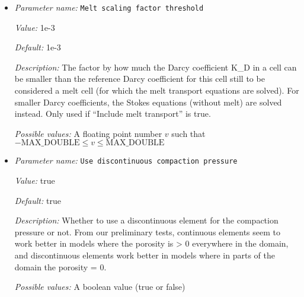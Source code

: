 \begin{itemize}
{\it Value:} false


{\it Default:} false


{\it Description:} Whether to include the transport of melt into the model or not. If this is set to true, two additional pressures (the fluid pressure and the compaction pressure) will be added to the finite element. Including melt transport in the simulation also requires that there is one compositional field that has the name `porosity'. This field will be used for computing the additional pressures and the melt velocity, and has a different advection equation than other compositional fields, as it is effectively advected with the melt velocity.


{\it Possible values:} A boolean value (true or false)
\item {\it Parameter name:} {\tt Melt scaling factor threshold}
\label{parameters:Melt settings/Melt scaling factor threshold}
\label{parameters:Melt_20settings/Melt_20scaling_20factor_20threshold}


{\it Value:} 1e-3


{\it Default:} 1e-3


{\it Description:} The factor by how much the Darcy coefficient K\_D in a cell can be smaller than the reference Darcy coefficient for this cell still to be considered a melt cell (for which the melt transport equations are solved). For smaller Darcy coefficients, the Stokes equations (without melt) are solved instead. Only used if ``Include melt transport'' is true. 


{\it Possible values:} A floating point number $v$ such that $-\text{MAX\_DOUBLE} \leq v \leq \text{MAX\_DOUBLE}$
\item {\it Parameter name:} {\tt Use discontinuous compaction pressure}
\label{parameters:Melt settings/Use discontinuous compaction pressure}
\label{parameters:Melt_20settings/Use_20discontinuous_20compaction_20pressure}


{\it Value:} true


{\it Default:} true


{\it Description:} Whether to use a discontinuous element for the compaction pressure or not. From our preliminary tests, continuous elements seem to work better in models where the porosity is > 0 everywhere in the domain, and discontinuous elements work better in models where in parts of the domain the porosity = 0.


{\it Possible values:} A boolean value (true or false)
\end{itemize}


